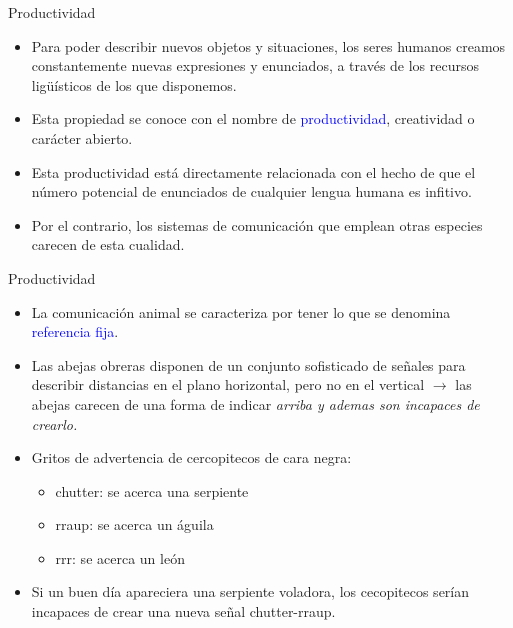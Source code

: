\documentclass[handout]{beamer}
\begin{document}
\begin{frame}{Productividad}

\begin{itemize}
	\item Para poder describir nuevos objetos y situaciones, los seres humanos creamos constantemente nuevas expresiones y enunciados, a través de los recursos ligüísticos de los que disponemos.
	\item Esta propiedad se conoce con el nombre de \textcolor{blue}{productividad}, creatividad o carácter abierto.
	\item Esta productividad está directamente relacionada con el hecho de que el número potencial de enunciados de cualquier lengua humana es infitivo.
	\item Por el contrario, los sistemas de comunicación que emplean otras especies carecen de esta cualidad.
\end{itemize}

\end{frame}

\begin{frame}{Productividad}
\begin{itemize}
	\item La comunicación animal se caracteriza por tener lo que se denomina \textcolor{blue}{referencia fija}.
	\item Las abejas obreras disponen de un conjunto sofisticado de señales para describir distancias en el plano horizontal, pero no en el vertical $\rightarrow$ las abejas carecen de una forma de indicar \it{arriba} y ademas son incapaces de crearlo.
	\item Gritos de advertencia de cercopitecos de cara negra:
	\begin{itemize}
		\item chutter: se acerca una serpiente
		\item rraup: se acerca un águila
		\item rrr: se acerca un león
	\end{itemize}
	\item Si un buen día apareciera una serpiente voladora, los cecopitecos serían incapaces de crear una nueva señal chutter-rraup.
\end{itemize}
\end{frame}
\end{document}

